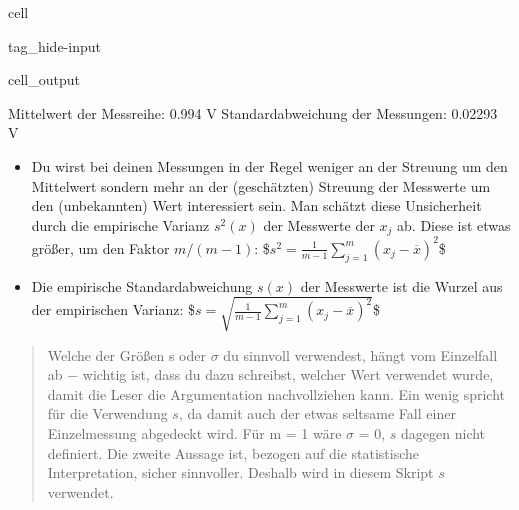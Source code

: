 \documentclass[letterpaper,10pt,english]{jupyterBook}
\begin{document}
\begin{sphinxuseclass}{cell}
\begin{sphinxuseclass}{tag_hide-input}\begin{sphinxVerbatimOutput}

\begin{sphinxuseclass}{cell_output}
\begin{sphinxVerbatim}[commandchars=\\\{\}]
Mittelwert der Messreihe:  0.994 V
Standardabweichung der Messungen:  0.02293 V
\end{sphinxVerbatim}

\noindent{}

\end{sphinxuseclass}\end{sphinxVerbatimOutput}

\end{sphinxuseclass}
\end{sphinxuseclass}\begin{itemize}
\item {} 
\sphinxAtStartPar
Du wirst bei deinen Messungen in der Regel weniger an der Streuung um den Mittelwert sondern mehr an der (geschätzten) Streuung der Messwerte um den (unbekannten)  Wert interessiert sein. Man schätzt diese Unsicherheit durch die empirische Varianz \(s^2(x)\) der Messwerte der \(x_j\) ab. Diese ist etwas größer, um den Faktor \(m/(m − 1)\):
\$\(s^2 = \frac{1}{m-1} \sum_{j=1}^m (x_j - \overline x)^2\)\$

\item {} 
\sphinxAtStartPar
Die empirische Standardabweichung \(s(x)\) der Messwerte ist die Wurzel aus der empirischen Varianz:
\$\(s = \sqrt{\frac{1}{m-1} \sum_{j=1}^m (x_j - \overline x)^2}\)\$

\end{itemize}
\begin{quote}

\sphinxAtStartPar
Welche der Größen s oder \(\sigma\) du sinnvoll verwendest, hängt vom Einzelfall ab − wichtig ist, dass du dazu schreibst, welcher Wert verwendet wurde, damit die Leser die Argumentation nachvollziehen kann. Ein wenig spricht für die Verwendung \(s\), da damit auch der etwas seltsame Fall einer Einzelmessung abgedeckt wird. Für m = 1 wäre \(\sigma\) = 0, \(s\) dagegen nicht definiert. Die zweite Aussage ist, bezogen auf die statistische Interpretation, sicher sinnvoller. Deshalb wird in diesem Skript \(s\) verwendet.
\end{quote}
\end{document}
